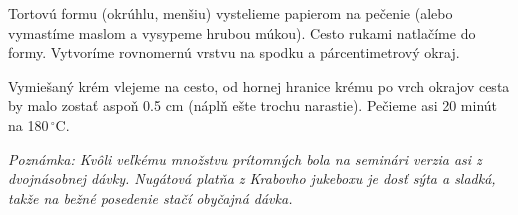 \documentclass[12pt]{article}
\begin{document}
Tortovú formu (okrúhlu, menšiu) vystelieme papierom na pečenie (alebo vymastíme maslom a vysypeme hrubou múkou). Cesto rukami natlačíme do formy. Vytvoríme rovnomernú vrstvu na spodku a párcentimetrový okraj.

Vymiešaný krém vlejeme na cesto, od hornej hranice krému po vrch okrajov cesta by malo zostať aspoň 0.5 cm (náplň ešte trochu narastie). Pečieme asi 20 minút na 180\,${}^\circ$C.

\textit{Poznámka: Kvôli veľkému množstvu prítomných bola na seminári verzia asi z dvojnásobnej dávky. Nugátová platňa z Krabovho jukeboxu je dosť sýta a sladká, takže na bežné posedenie stačí obyčajná dávka.}
\end{document}

